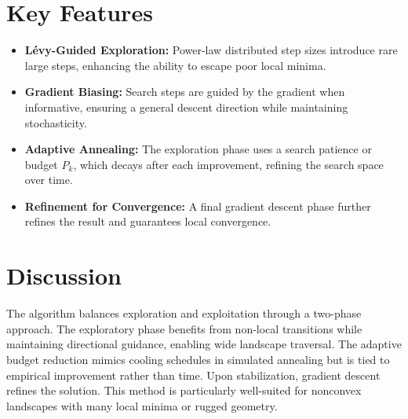 \documentclass{article}
\begin{document}
\section{Key Features}

\begin{itemize}
    \item \textbf{Lévy-Guided Exploration:} Power-law distributed step sizes introduce rare large steps, enhancing the ability to escape poor local minima.
    \item \textbf{Gradient Biasing:} Search steps are guided by the gradient when informative, ensuring a general descent direction while maintaining stochasticity.
    \item \textbf{Adaptive Annealing:} The exploration phase uses a search patience or budget \( P_k \), which decays after each improvement, refining the search space over time.
    \item \textbf{Refinement for Convergence:} A final gradient descent phase further refines the result and guarantees local convergence.
\end{itemize}

\section{Discussion}

The algorithm balances exploration and exploitation through a two-phase approach. The exploratory phase benefits from non-local transitions while maintaining directional guidance, enabling wide landscape traversal. The adaptive budget reduction mimics cooling schedules in simulated annealing but is tied to empirical improvement rather than time. Upon stabilization, gradient descent refines the solution. This method is particularly well-suited for nonconvex landscapes with many local minima or rugged geometry.
\end{document}
